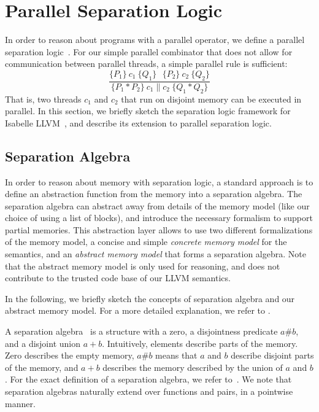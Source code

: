 \documentclass[runningheads]{llncs}
\begin{document}
  \section{Parallel Separation Logic}\label{sec:seplogic}
  In order to reason about programs with a parallel operator, we define a parallel separation logic~\cite{OH04}.
  For our simple parallel combinator that does not allow for communication between parallel threads,
  a simple parallel rule is sufficient:
  \[
    \frac{\{P_1\} ~c_1~ \{Q_1\}~~~\{P_2\} ~c_2~ \{Q_2\}}{ \{P_1 * P_2\} ~c_1 \parallel c_2~ \{Q_1 * Q_2\} }
  \]
  That is, two threads $c_1$ and $c_2$ that run on disjoint memory can be executed in parallel. In this section, we briefly sketch the separation logic framework for Isabelle LLVM~\cite{La19-llvm}, and describe its extension to parallel separation logic.

  \subsection{Separation Algebra}
  In order to reason about memory with separation logic, a standard approach is
  to define an abstraction function from the memory into a separation algebra.
  The separation algebra can abstract away from details of the memory model
  (like our choice of using a list of blocks), and introduce the necessary
  formalism to support partial memories. This abstraction layer allows to use two different
  formalizations of the memory model, a concise and simple \emph{concrete memory model} for the semantics,
  and an \emph{abstract memory model} that forms a separation algebra.
  Note that the abstract memory model is only used for reasoning, and does not contribute to the
  trusted code base of our LLVM semantics.

  In the following, we briefly sketch the concepts of separation algebra and our abstract memory model.
  For a more detailed explanation, we refer to \cite{CHY07,La19-llvm}.

  A separation algebra~\cite{CHY07} is a structure with a zero, a disjointness predicate $a\#b$,
  and a disjoint union $a+b$.
  Intuitively, elements describe parts of the memory.
  Zero describes the empty memory, $a\#b$ means that $a$ and $b$ describe disjoint parts of the memory,
  and $a+b$ describes the memory described by the union of $a$ and $b$.
  For the exact definition of a separation algebra, we refer to~\cite{CHY07,KKB12}. We note that
  separation algebras naturally extend over functions and pairs, in a pointwise manner.
\end{document}
